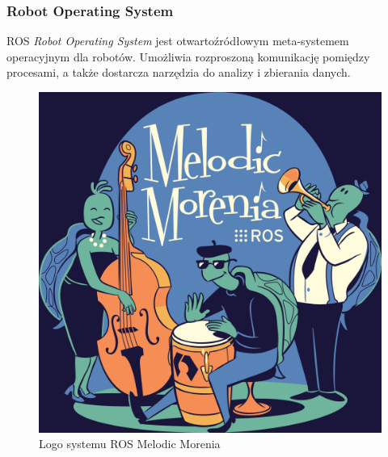 
\begin{frame}
	\frametitle{Robot Operating System}
	\begin{block}{ROS}
		\textit{Robot Operating System} jest otwartoźródłowym meta-systemem operacyjnym dla robotów.
		Umożliwia rozproszoną komunikację pomiędzy procesami, a także dostarcza narzędzia
		do analizy i zbierania danych.
	\end{block}
	\medskip
	\begin{figure}
		\includegraphics[scale=0.2]{./images/ros-melodic.png}
		\caption{Logo systemu ROS Melodic Morenia}
	\end{figure}
\end{frame}


